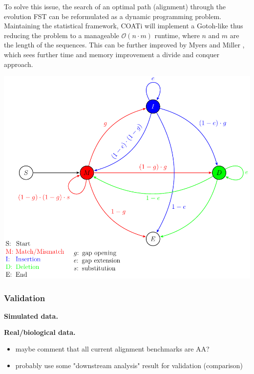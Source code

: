 To solve this issue, the search of an optimal path (alignment) through the
evolution FST can be reformulated as a dynamic programming problem.
Maintaining the statistical framework, COATi will implement a Gotoh-like
thus reducing the problem to a manageable $\mathcal{O}(n \cdot m)$ runtime,
where $n$ and $m$ are the length of the sequences.
This can be further improved by  Myers and Miller
, which sees further time and memory improvement  a
divide and conquer approach.

\begin{center}
    \hspace*{-3cm}\includegraphics[scale=0.75]{figures/fig-dp-model.pdf}
\end{center}

\subsubsection{Validation}
\textbf{Simulated data.}

\textbf{Real/biological data.}
\begin{itemize}
    \item maybe comment that all current alignment benchmarks are AA?
    \item probably use some "downstream analysis" result for validation (comparison)
\end{itemize}
